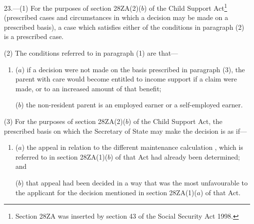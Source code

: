 \documentclass[12pt,a4paper]{article}
\begin{document}
23.—(1) For the purposes of section 28ZA(2)($b$) of the Child Support Act\footnote{\frenchspacing Section 28ZA was inserted by section 43 of the Social Security Act 1998.} (prescribed cases and circumstances in which a decision may be made on a prescribed basis), a case which satisfies either of the conditions in paragraph (2) is a prescribed case.

(2) The conditions referred to in paragraph (1) are that—
\begin{enumerate}\item[]
($a$) if a decision were not made on the basis prescribed in paragraph (3), the parent with care would become entitled to income support if a claim were made, or to an increased amount of that benefit;

($b$) the 
non-resident parent  %
is an employed earner or a self-employed earner.
\end{enumerate}

(3) For the purposes of section 28ZA(2)($b$) of the Child Support Act, the prescribed basis on which the 
Secretary of State %
may make the decision is as if—
\begin{enumerate}\item[]
($a$) the appeal in relation to the different maintenance 
calculation%
, which is referred to in section 28ZA(1)($b$) of that Act had already been determined; and

($b$) that appeal had been decided in a way that was the most unfavourable to the applicant for the decision mentioned in section 28ZA(1)($a$) of that Act.
\end{enumerate}
\end{document}
